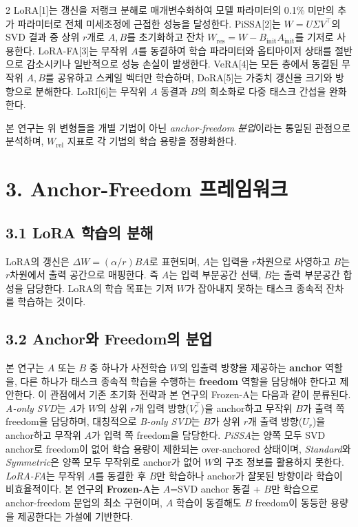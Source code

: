 \documentclass[a4paper,10pt]{article}
\begin{document}
\begin{multicols}{2}
LoRA[1]는 갱신을 저랭크 분해로 매개변수화하여 모델 파라미터의 0.1\% 미만의 추가 파라미터로 전체 미세조정에 근접한 성능을 달성한다. PiSSA[2]는 $W = U \Sigma V^\top$의 SVD 결과 중 상위 $r$개로 $A, B$를 초기화하고 잔차 $W_{\text{res}} = W - B_{\text{init}} A_{\text{init}}$를 기저로 사용한다. LoRA-FA[3]는 무작위 $A$를 동결하여 학습 파라미터와 옵티마이저 상태를 절반으로 감소시키나 일반적으로 성능 손실이 발생한다. VeRA[4]는 모든 층에서 동결된 무작위 $A,B$를 공유하고 스케일 벡터만 학습하며, DoRA[5]는 가중치 갱신을 크기와 방향으로 분해한다. LoRI[6]는 무작위 $A$ 동결과 $B$의 희소화로 다중 태스크 간섭을 완화한다.

본 연구는 위 변형들을 개별 기법이 아닌 \textit{anchor-freedom 분업}이라는 통일된 관점으로 분석하며, $W_{\text{rel}}$ 지표로 각 기법의 학습 용량을 정량화한다.

\section*{3. Anchor-Freedom 프레임워크}

\subsection*{3.1 LoRA 학습의 분해}

LoRA의 갱신은 $\Delta W = (\alpha/r) B A$로 표현되며, $A$는 입력을 $r$차원으로 사영하고 $B$는 $r$차원에서 출력 공간으로 매핑한다. 즉 $A$는 입력 부분공간 선택, $B$는 출력 부분공간 합성을 담당한다. LoRA의 학습 목표는 기저 $W$가 잡아내지 못하는 태스크 종속적 잔차를 학습하는 것이다.

\subsection*{3.2 Anchor와 Freedom의 분업}

본 연구는 $A$ 또는 $B$ 중 하나가 사전학습 $W$의 입출력 방향을 제공하는 \textbf{anchor} 역할을, 다른 하나가 태스크 종속적 학습을 수행하는 \textbf{freedom} 역할을 담당해야 한다고 제안한다. 이 관점에서 기존 초기화 전략과 본 연구의 Frozen-A는 다음과 같이 분류된다. \textit{A-only SVD}는 $A$가 $W$의 상위 $r$개 입력 방향($V_r^\top$)을 anchor하고 무작위 $B$가 출력 쪽 freedom을 담당하며, 대칭적으로 \textit{B-only SVD}는 $B$가 상위 $r$개 출력 방향($U_r$)을 anchor하고 무작위 $A$가 입력 쪽 freedom을 담당한다. \textit{PiSSA}는 양쪽 모두 SVD anchor로 freedom이 없어 학습 용량이 제한되는 over-anchored 상태이며, \textit{Standard}와 \textit{Symmetric}은 양쪽 모두 무작위로 anchor가 없어 $W$의 구조 정보를 활용하지 못한다. \textit{LoRA-FA}는 무작위 $A$를 동결한 후 $B$만 학습하나 anchor가 잘못된 방향이라 학습이 비효율적이다. 본 연구의 \textbf{Frozen-A}는 $A$=SVD anchor 동결 + $B$만 학습으로 anchor-freedom 분업의 최소 구현이며, $A$ 학습이 동결해도 $B$ freedom이 동등한 용량을 제공한다는 가설에 기반한다.


\end{multicols}
\end{document}
